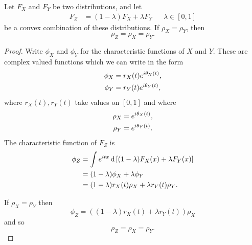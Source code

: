 	\begin{theorem}
	\label{thm:equal phase functions convex set}
		Let $F_X$ and $F_Y$ be two distributions, and let
		\begin{align}
			F_Z &= (1 - \lambda) F_X + \lambda F_Y && \lambda \in [0,1]
		\end{align}
		be a convex combination of these distributions. If $\rho_X = \rho_Y$, then 
		\begin{equation}
			\rho_Z = \rho_X = \rho_Y.
		\end{equation}
	\end{theorem}
	\begin{proof}
		Write $\phi_X$ and $\phi_Y$ for the characteristic functions of $X$ and $Y$. These are complex valued functions which we can write in the form
		\begin{align}
			\phi_X &= r_X(t) e^{i\theta_X(t)},\\
			\phi_Y &= r_Y(t) e^{i\theta_Y(t)},
		\end{align}
		where $r_X(t), r_Y(t)$ take values on $[0, 1]$ and where
		\begin{align}
			\rho_X &= e^{i\theta_X(t)},\\
			\rho_Y &= e^{i\theta_Y(t)}.
		\end{align}
		The characteristic function of $F_Z$ is 
		\begin{align}
			\phi_Z &= \int e^{itx} \, \mathrm{d} \left[(1 - \lambda)F_X(x) + \lambda F_Y(x)\right]\\
			&= (1 - \lambda)\phi_X + \lambda \phi_Y\\
			&= (1 - \lambda) r_X(t) \rho_X + \lambda r_Y(t) \rho_Y.
		\end{align}

		If $\rho_X = \rho_Y$ then
		\begin{equation}
			\phi_Z = \left((1 - \lambda)r_X(t) + \lambda r_Y(t)\right) \rho_X
		\end{equation}
		and so 
		\begin{equation}
			\rho_Z = \rho_X = \rho_Y.
		\end{equation}
	\end{proof}

